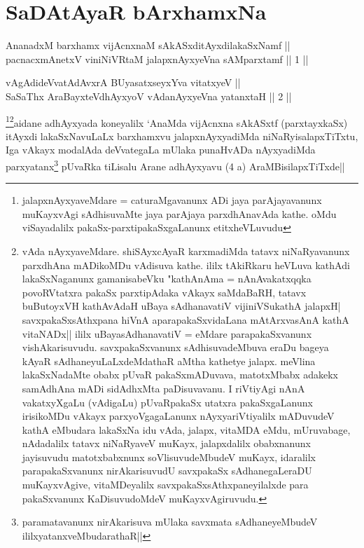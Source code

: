 \chapter{SaDAtAyaR bArxhamxNa}


\begin{shl}
AnanadxM barxhamx vijAcnxnaM sAkASxditAyxdilakaSxNamf || \\
pacnacxmAnetxV viniNiVRtaM jalapxnAyxyeVna sAMparxtamf ||  1 ||  
\end{shl}
				
\begin{shl}
vAgAdideVvatAdAvxrA BUyasatxseyxYva vitatxyeV || \\
SaSaThx AraBayxteV\s dhAyxyoV vAdanAyxyeVna yatanxtaH ||  2 ||  
\end{shl}

\begin{artha}
\footnote{jalapxnAyxyaveMdare = caturaMgavanunx ADi jaya parAjayavanunx muKayxvAgi sAdhisuvaMte jaya parAjaya parxdhAnavAda kathe. oMdu viSayadalilx pakaSx-parxtipakaSxgaLanunx etitxheVLuvudu}\footnote{vAda nAyxyaveMdare. shiSAyxcAyaR karxmadiMda tatavx niNaRyavanunx parxdhAna mADikoMDu vAdisuva kathe. ililx tAkiRkaru heVLuva kathAdi lakaSxNaganunx gamanisabeVku "kathAnAma = nAnAvakatxqqka povoRVtatxra pakaSx parxtipAdaka vAkayx saMdaBaRH, tatavx buButoyxVH kathAvAdaH uBaya sAdhanavatiV vijiniVSukathA jalapxH| savxpakaSxsAthxpana hiVnA aparapakaSxvidaLana mAtArxvasAnA kathA vitaNADx|| ililx uBayasAdhanavatiV = eMdare parapakaSxvanunx vishAkarisuvudu. savxpakaSxvanunx sAdhisuvadeMbuva eraDu bageya kAyaR sAdhaneyuLaLxdeMdathaR aMtha kathetye jalapx. meVlina lakaSxNadaMte obabx pUvaR pakaSxmADuvava, matotxMbabx adakekx samAdhAna mADi sidAdhxMta paDisuvavanu. I riVtiyAgi nAnA vakatxyXgaLu (vAdigaLu) pUvaRpakaSx utatxra pakaSxgaLanunx irisikoMDu vAkayx parxyoVgagaLanunx nAyxyariVtiyalilx mADuvudeV kathA eMbudara lakaSxNa idu vAda, jalapx, vitaMDA eMdu, mUruvabage, nAdadalilx tatavx niNaRyaveV muKayx, jalapxdalilx obabxnanunx jayisuvudu matotxbabxnunx soVlisuvudeMbudeV muKayx, idaralilx parapakaSxvanunx nirAkarisuvudU savxpakaSx sAdhanegaLeraDU muKayxvAgive, vitaMDeyalilx savxpakaSxsAthxpaneyilalxde para pakaSxvanunx KaDisuvudoMdeV muKayxvAgiruvudu.}aidane adhAyxyada koneyalilx `AnaMda vijAcnxna sAkASxtf (parxtayxkaSx) itAyxdi lakaSxNavuLaLx barxhamxvu jalapxnAyxyadiMda niNaRyisalapxTiTxtu, Iga vAkayx modalAda deVvategaLa mUlaka punaHvADa nAyxyadiMda parxyatanx\footnote{paramatavanunx nirAkarisuva mUlaka savxmata sAdhaneyeMbudeV ililxyatanxveMbudarathaR||} pUvaRka tiLisalu Arane adhAyxyavu (4 a) AraMBisilapxTiTxde||
\end{artha}

